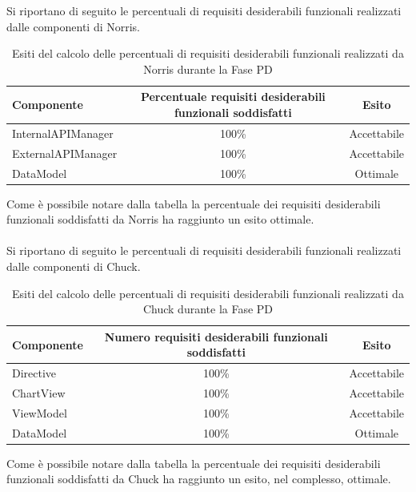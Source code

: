 				Si riportano di seguito le percentuali di requisiti desiderabili funzionali realizzati dalle componenti di Norris.
				\begin{table}[H]
					\centering
						\begin{tabu}{| l | c | c |}
							\hline
							Componente			& 	Percentuale requisiti desiderabili funzionali soddisfatti	& Esito		\\ \hline \hline
							InternalAPIManager	& 	100\% 	& Accettabile  \\ \hline
							ExternalAPIManager  & 	100\%	& Accettabile  \\ \hline
							DataModel  			& 	100\%	& Ottimale  \\ \hline
						\end{tabu}
					\caption{Esiti del calcolo delle percentuali di requisiti desiderabili funzionali realizzati da Norris durante la Fase PD}
				\end{table}
				Come è possibile notare dalla tabella la percentuale dei requisiti desiderabili funzionali soddisfatti da Norris ha raggiunto un esito ottimale. 
				\\ \\
				Si riportano di seguito le percentuali di requisiti desiderabili funzionali realizzati dalle componenti di Chuck.
				\begin{table}[H]
					\centering
						\begin{tabu}{| l | c | c |}
							\hline
							Componente	& Numero requisiti desiderabili funzionali soddisfatti	& Esito		\\ \hline \hline
							Directive	&	100\% 	& Accettabile  \\ \hline
							ChartView	& 	100\%	& Accettabile  \\ \hline
							ViewModel	& 	100\%	& Accettabile  \\ \hline
							DataModel	& 	100\%	& Ottimale  	\\ \hline
						\end{tabu}
					\caption{Esiti del calcolo delle percentuali di requisiti desiderabili funzionali realizzati da Chuck durante la Fase PD}
				\end{table}
				Come è possibile notare dalla tabella la percentuale dei requisiti desiderabili funzionali soddisfatti da Chuck ha raggiunto un esito, nel complesso, ottimale.

